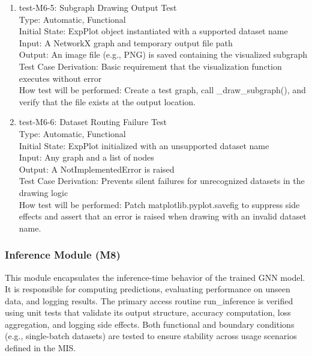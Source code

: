 \documentclass[12pt, titlepage]{article}
\begin{document}
\begin{enumerate}
\item{test-M6-5: Subgraph Drawing Output Test\\}
Type: Automatic, Functional \\
Initial State: ExpPlot object instantiated with a supported dataset name \\
Input: A NetworkX graph and temporary output file path \\
Output: An image file (e.g., PNG) is saved containing the visualized subgraph \\
Test Case Derivation: Basic requirement that the visualization function executes without error \\
How test will be performed: Create a test graph, call \_draw\_subgraph(), and verify that the file exists at the output location.

\item{test-M6-6: Dataset Routing Failure Test\\}
Type: Automatic, Functional \\
Initial State: ExpPlot initialized with an unsupported dataset name \\
Input: Any graph and a list of nodes \\
Output: A NotImplementedError is raised \\
Test Case Derivation: Prevents silent failures for unrecognized datasets in the drawing logic \\
How test will be performed: Patch matplotlib.pyplot.savefig to suppress side effects and assert that an error is raised when drawing with an invalid dataset name.

\end{enumerate}




\subsubsection{Inference Module (M8)}

This module encapsulates the inference-time behavior of the trained GNN model. It is responsible for computing predictions, evaluating performance on unseen data, and logging results. The primary access routine run\_inference is verified using unit tests that validate its output structure, accuracy computation, loss aggregation, and logging side effects. Both functional and boundary conditions (e.g., single-batch datasets) are tested to ensure stability across usage scenarios defined in the MIS.
\end{document}
